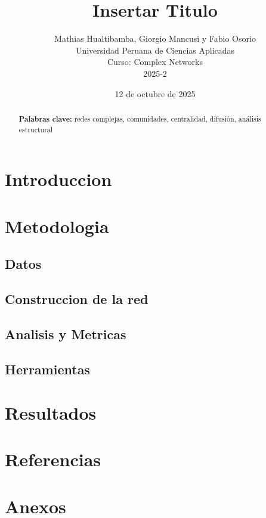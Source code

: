\documentclass[twocolumn]{article}
\title{Insertar Titulo}
\author{
    Mathias Hualtibamba, Giorgio Mancusi y Fabio Osorio \\
    Universidad Peruana de Ciencias Aplicadas \\
    Curso: Complex Networks \\
    2025-2 
}
\date{12 de octubre de 2025}
\newcommand{\keywords}[1]{\par\noindent\textbf{Palabras clave:} #1}
\begin{document}
\maketitle

\begin{abstract}
\blindtext[1]
\keywords{redes complejas, comunidades, centralidad, difusión, análisis estructural}
\end{abstract}

\section{Introduccion}
\blindtext[2]

\section{Metodologia}
\blindtext[3]

\subsection{Datos}
\blindtext[1]

\subsection{Construccion de la red}
\blindtext[1]

\subsection{Analisis y Metricas}
\blindtext[1]

\subsection{Herramientas}
\blindtext[1]

\section{Resultados}
\blindtext[4]

\section{Referencias}
\printbibliography

\section{Anexos}
\blindtext[1
]
\end{document}
